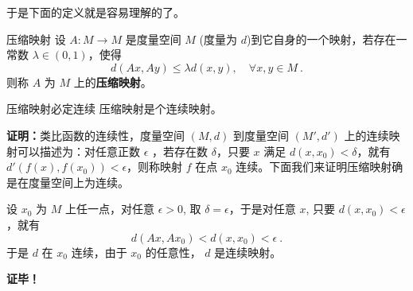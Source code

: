 于是下面的定义就是容易理解的了。
\begin{definition}{压缩映射}
设 $A:M\rightarrow M$ 是度量空间 $M$ (度量为 $d$)到它自身的一个映射，若存在一常数 $\lambda\in(0,1)$，使得
\begin{equation}
d(Ax,Ay)\leq \lambda d(x,y),\quad \forall x,y\in M~.
\end{equation}
 则称 $A$ 为 $M$ 上的\textbf{压缩映射}。
\end{definition}
\begin{theorem}{压缩映射必定连续}
压缩映射是个连续映射。
\end{theorem}
\textbf{证明：}类比函数的连续性，度量空间 $(M,d)$ 到度量空间 $(M',d')$ 上的连续映射可以描述为：对任意正数 $\epsilon$ ，若存在数 $\delta$，只要 $x$ 满足 $d(x,x_0)<\delta$，就有 $d'(f(x),f(x_0))<\epsilon$，则称映射 $f$ 在点 $x_0$ 连续。下面我们来证明压缩映射确是在度量空间上为连续。

设 $x_0$ 为 $M$ 上任一点，对任意 $\epsilon>0$, 取 $\delta=\epsilon$，于是对任意 $x$, 只要 $d(x,x_0)<\epsilon$，就有
\begin{equation}
d(A x,A x_0)<d(x,x_0)<\epsilon~.
\end{equation}
于是 $d$ 在 $x_0$ 连续，由于 $x_0$ 的任意性， $d$ 是连续映射。



\textbf{证毕！}